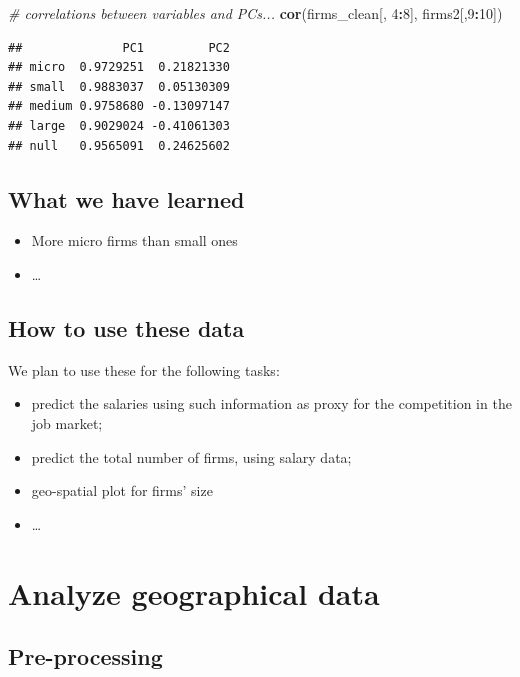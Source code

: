 \documentclass[]{article}
\newenvironment{Shaded}{\begin{snugshade}}{\end{snugshade}}
\newcommand{\KeywordTok}[1]{\textcolor[rgb]{0.13,0.29,0.53}{\textbf{#1}}}
\newcommand{\DecValTok}[1]{\textcolor[rgb]{0.00,0.00,0.81}{#1}}
\newcommand{\CommentTok}[1]{\textcolor[rgb]{0.56,0.35,0.01}{\textit{#1}}}
\newcommand{\OperatorTok}[1]{\textcolor[rgb]{0.81,0.36,0.00}{\textbf{#1}}}
\newcommand{\NormalTok}[1]{#1}
\providecommand{\tightlist}{%
  \setlength{\itemsep}{0pt}\setlength{\parskip}{0pt}}
\begin{document}
\begin{Shaded}
\begin{Highlighting}[]
\CommentTok{# correlations between variables and PCs...}
\KeywordTok{cor}\NormalTok{(firms_clean[, }\DecValTok{4}\OperatorTok{:}\DecValTok{8}\NormalTok{], firms2[,}\DecValTok{9}\OperatorTok{:}\DecValTok{10}\NormalTok{])}
\end{Highlighting}
\end{Shaded}

\begin{verbatim}
##              PC1         PC2
## micro  0.9729251  0.21821330
## small  0.9883037  0.05130309
## medium 0.9758680 -0.13097147
## large  0.9029024 -0.41061303
## null   0.9565091  0.24625602
\end{verbatim}

\subsection{What we have learned}\label{what-we-have-learned}

\begin{itemize}
\tightlist
\item
  More micro firms than small ones
\item
  \ldots{}
\end{itemize}

\subsection{How to use these data}\label{how-to-use-these-data}

We plan to use these for the following tasks:

\begin{itemize}
\tightlist
\item
  predict the salaries using such information as proxy for the
  competition in the job market;
\item
  predict the total number of firms, using salary data;
\item
  geo-spatial plot for firms' size
\item
  \ldots{}
\end{itemize}

\section{Analyze geographical data}\label{analyze-geographical-data}

\subsection{Pre-processing}\label{pre-processing-1}
\end{document}
